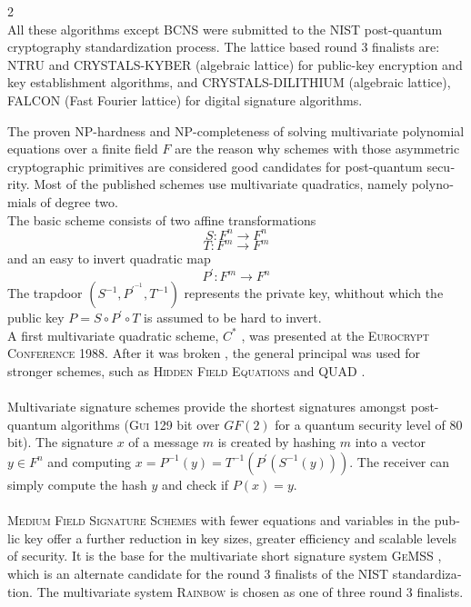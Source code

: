 \documentclass[a4paper,11pt]{article}
\begin{document}
\begin{otherlanguage}{english}
\begin{multicols}{2}
\\
All these algorithms except \textsc{BCNS} were submitted to the NIST post-quantum cryptography standardization process. The lattice based round 3 finalists are: \textsc{NTRU} and \textsc{CRYSTALS-KYBER} (algebraic lattice) for public-key encryption and key establishment algorithms, and \textsc{CRYSTALS-DILITHIUM} (algebraic lattice), \textsc{FALCON} (Fast Fourier lattice) for digital signature algorithms.


\noindent
The proven NP-hardness and NP-completeness of solving multivariate polynomial equations over a finite field $F$ are the reason why schemes with those asymmetric cryptographic primitives are considered good candidates for post-quantum security. Most of the published schemes use multivariate quadratics, namely polynomials of degree two. \\
The basic scheme consists of two affine transformations 
$$S: F^n \rightarrow F^n$$
$$T: F^m \rightarrow F^m$$
and an easy to invert quadratic map 
$$P^{\prime} : F^m \rightarrow F^n$$ 
\noindent
The trapdoor $(S^{-1}, P^{\prime^{-1}}, T^{-1})$ represents the private key, whithout which the public key $P = S \circ P^{\prime} \circ T$ is assumed to be hard to invert.\\ 
A first multivariate quadratic scheme, $C^*$ \cite{MI}, was presented at the \textsc{Eurocrypt Conference} 1988. After it was broken \cite{P95}, the general principal was used for stronger schemes, such as \textsc{Hidden Field Equations} \cite{HFE} and \textsc{QUAD} \cite{BGP}. \\
\\
Multivariate signature schemes provide the shortest signatures amongst post-quantum algorithms (\textsc{Gui} \cite{GUI} 129 bit over $GF(2)$ for a quantum security level of 80 bit). The signature $x$ of a message $m$ is created by hashing $m$ into a vector $y \in F^n$ and computing $x = P^{-1}(y) = T^{-1} (P^{\prime}(S^{-1}(y)))$. The receiver can simply compute the hash $y$ and check if $P(x) = y$. \\
\\
\textsc{Medium Field Signature Schemes} \cite{HMFE} with fewer equations and variables in the public key offer a further reduction in key sizes, greater efficiency and scalable levels of security. It is the base for the multivariate short signature system \textsc{GeMSS} \cite{GMSS}, which is an alternate candidate for the round 3 finalists of the NIST standardization. The multivariate system \textsc{Rainbow} \cite{RBW} is chosen as one of three round 3 finalists.


\end{multicols}
\end{otherlanguage}
\end{document}
